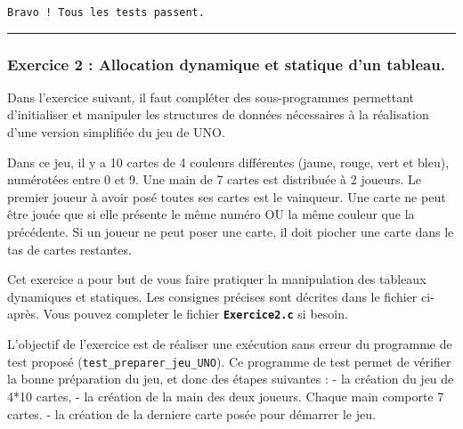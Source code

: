 \documentclass[11pt]{article}
\begin{document}
    \begin{Verbatim}[commandchars=\\\{\}]
Bravo ! Tous les tests passent.

    \end{Verbatim}

    \begin{center}\rule{0.5\linewidth}{\linethickness}\end{center}

    \subsubsection{Exercice 2 : Allocation dynamique et statique d'un
tableau.}\label{exercice-2-allocation-dynamique-et-statique-dun-tableau.}

Dans l'exercice suivant, il faut compléter des sous-programmes
permettant d'initialiser et manipuler les structures de données
nécessaires à la réalisation d'une version simplifiée du jeu de UNO.

Dans ce jeu, il y a 10 cartes de 4 couleurs différentes (jaune, rouge,
vert et bleu), numérotées entre 0 et 9. Une main de 7 cartes est
distribuée à 2 joueurs. Le premier joueur à avoir posé toutes ses cartes
est le vainqueur. Une carte ne peut être jouée que si elle présente le
même numéro OU la même couleur que la précédente. Si un joueur ne peut
poser une carte, il doit piocher une carte dans le tas de cartes
restantes.

Cet exercice a pour but de vous faire pratiquer la manipulation des
tableaux dynamiques et statiques. Les consignes précises sont décrites
dans le fichier ci-après. Vous pouvez completer le fichier
\textbf{\texttt{Exercice2.c}} si besoin.

L'objectif de l'exercice est de réaliser une exécution sans erreur du
programme de test proposé (\texttt{test\_preparer\_jeu\_UNO}). Ce
programme de test permet de vérifier la bonne préparation du jeu, et
donc des étapes suivantes : - la création du jeu de 4*10 cartes, - la
création de la main des deux joueurs. Chaque main comporte 7 cartes. -
la création de la derniere carte posée pour démarrer le jeu.
\end{document}
